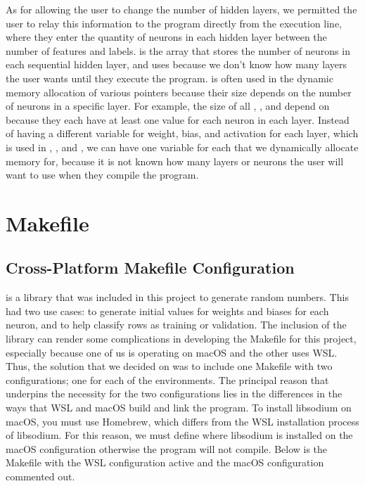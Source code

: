\documentclass[12pt]{article}
\begin{document}
As for allowing the user to change the number of hidden layers, we permitted the user to relay this information to the program directly from the execution line, where they enter the quantity of neurons in each hidden layer between the number of features and labels.  is the array that stores the number of neurons in each sequential hidden layer, and uses  because we don’t know how many layers the user wants until they execute the program.  is often used in the dynamic memory allocation of various pointers because their size depends on the number of neurons in a specific layer. For example, the size of all , , and  depend on  because they each have at least one value for each neuron in each layer. Instead of having a different variable for weight, bias, and activation for each layer, which is used in , , and , we can have one variable for each that we dynamically allocate memory for, because it is not known how many layers or neurons the user will want to use when they compile the program.

\section{Makefile}

\subsection{Cross-Platform Makefile Configuration}

 is a library that was included in this project to generate random numbers. This had two use cases: to generate initial values for weights and biases for each neuron, and to help classify rows as training or validation. The inclusion of the  library can render some complications in developing the Makefile for this project, especially because one of us is operating on macOS and the other uses WSL. Thus, the solution that we decided on was to include one Makefile with two configurations; one for each of the environments. The principal reason that underpins the necessity for the two configurations lies in the differences in the ways that WSL and macOS build and link the program. To install libsodium on macOS, you must use Homebrew, which differs from the WSL installation process of libsodium. For this reason, we must define where libsodium is installed on the macOS configuration otherwise the program will not compile. Below is the Makefile with the WSL configuration active and the macOS configuration commented out.
\end{document}
